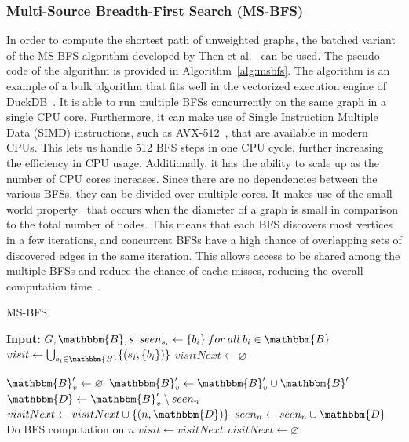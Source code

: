 \subsubsection{Multi-Source Breadth-First Search (MS-BFS)}
In order to compute the shortest path of unweighted graphs, the batched variant of the MS-BFS algorithm developed by Then et al.~\cite{10.14778/2735496.2735507} can be used. The pseudo-code of the algorithm is provided in Algorithm~\ref{alg:msbfs}. 
The algorithm is an example of a bulk algorithm that fits well in the vectorized execution engine of DuckDB~\cite{keynote-boncz-edbt-icdt-2022}. 
It is able to run multiple BFSs concurrently on the same graph in a single CPU core. 
Furthermore, it can make use of Single Instruction Multiple Data (SIMD) instructions, such as AVX-512~\cite{avx512}, that are available in modern CPUs. 
This lets us handle 512 BFS steps in one CPU cycle, further increasing the efficiency in CPU usage. 
Additionally, it has the ability to scale up as the number of CPU cores increases. Since there are no dependencies between the various BFSs, they can be divided over multiple cores. 
It makes use of the small-world property~\cite{smallworld} that occurs when the diameter of a graph is small in comparison to the total number of nodes.
This means that each BFS discovers most vertices in a few iterations, and concurrent BFSs have a high chance of overlapping sets of discovered edges in the same iteration. 
This allows access to be shared among the multiple BFSs and reduce the chance of cache misses, reducing the overall computation time~\cite{10.14778/2735496.2735507}.


\begin{algorithm}
\caption{MS-BFS}
\label{alg:msbfs}
\begin{algorithmic}[2]
    \State \textbf{Input:} $G,\mathbbm{B},s$
    \State $seen_{s_i} \leftarrow \{b_i\} \:for \: all \: b_i \in \mathbbm{B}$
    \State $visit \leftarrow \bigcup_{b_i \in \mathbbm{B}}\{(s_i,\{b_i\})\}$
    \State $visitNext \leftarrow \varnothing$
    
            \State $\mathbbm{B}'_v \leftarrow \varnothing$
                \State $\mathbbm{B}'_v \leftarrow \mathbbm{B}'_v \cup \mathbbm{B}'$
            \EndFor
                \State $\mathbbm{D} \leftarrow \mathbbm{B}'_v \setminus seen_n$
                    \State $visitNext \leftarrow visitNext \cup \{(n,\mathbbm{D})\}$
                    \State $seen_n \leftarrow seen_n \cup \mathbbm{D}$
                    \State Do BFS computation on $n$
                \EndIf
            \EndFor
        \EndFor
        \State $visit \leftarrow visitNext$
        \State $visitNext \leftarrow \varnothing$
    \EndWhile   
\end{algorithmic}
\end{algorithm}


